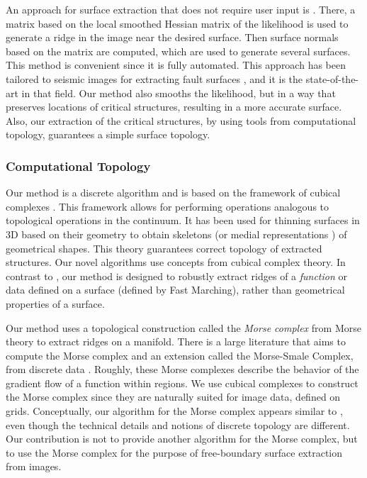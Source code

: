 \documentclass[10pt,journal,compsoc]{IEEEtran}
\newcommand{\comment}[1]{ }
\begin{document}
\comment{It is argued that minimal surfaces are more
natural extensions of the 2D shortest path problem to 3D.}

An approach for surface extraction that does not require user input is
\cite{schultz2010crease}. There, a matrix based on the local smoothed
Hessian matrix of the likelihood is used to generate a ridge in the
image near the desired surface. Then surface normals based on the
matrix are computed, which are used to generate several surfaces. This
method is convenient since it is fully automated. This approach has
been tailored to seismic images for extracting fault surfaces
\cite{hale2013methods}, and it is the state-of-the-art in that
field. Our method also smooths the likelihood, but in a way that
preserves locations of critical structures, resulting in a more
accurate surface. Also, our extraction of the critical structures, by
using tools from computational topology, guarantees a simple surface
topology.

\comment{However, it is sensitive to
noise as we show in experiments.}


\subsubsection{Computational Topology}
Our method is a discrete algorithm and is based on the framework of
cubical complexes
\cite{kovalevsky1989finite,kaczynski2006computational}. This framework
allows for performing operations analogous to topological operations
in the continuum. It has been used for thinning surfaces in 3D based
on their geometry \cite{chaussard2009surface} to obtain skeletons (or
medial representations
\cite{siddiqi1999shock,sebastian2004recognition, siddiqi2008medial}) of
geometrical shapes. This theory guarantees correct topology of
extracted structures. Our novel algorithms use concepts from cubical
complex theory. In contrast to \cite{chaussard2009surface}, our method
is designed to robustly extract ridges of a \emph{function} or data
defined on a surface (defined by Fast Marching), rather than
geometrical properties of a surface.

Our method uses a topological construction called the \emph{Morse
  complex} \cite{zomorodian2009topology} from Morse theory to extract
ridges on a manifold. There is a large literature that aims to compute
the Morse complex and an extension called the Morse-Smale Complex,
from discrete data \cite{edelsbrunner2001hierarchical,
  edelsbrunner2003morse, gyulassy2008practical,
  gyulassy2012computing}. Roughly, these Morse complexes describe the
behavior of the gradient flow of a function within regions. We use
cubical complexes to construct the Morse complex since they are
naturally suited for image data, defined on grids. Conceptually, our
algorithm for the Morse complex appears similar to
\cite{gyulassy2008practical}, even though the technical details and
notions of discrete topology are different. Our contribution is not to
provide another algorithm for the Morse complex, but to use the Morse
complex for the purpose of free-boundary surface extraction from
images.
\end{document}
